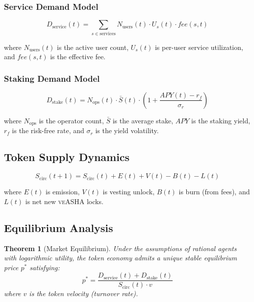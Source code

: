 \documentclass[11pt,a4paper]{article}
\newcommand{\veasha}{\textsc{veASHA}\xspace}
\newtheorem{theorem}{Theorem}
\begin{document}
\subsubsection{Service Demand Model}

\begin{equation}
    D_{\text{service}}(t) = \sum_{s \in \text{services}} N_{\text{users}}(t) \cdot U_s(t) \cdot \mathit{fee}(s, t)
\end{equation}

where $N_{\text{users}}(t)$ is the active user count, $U_s(t)$ is per-user service utilization, and $\mathit{fee}(s, t)$ is the effective fee.

\subsubsection{Staking Demand Model}

\begin{equation}
    D_{\text{stake}}(t) = N_{\text{ops}}(t) \cdot \bar{S}(t) \cdot \left(1 + \frac{\mathit{APY}(t) - r_f}{\sigma_r}\right)
\end{equation}

where $N_{\text{ops}}$ is the operator count, $\bar{S}$ is the average stake, $\mathit{APY}$ is the staking yield, $r_f$ is the risk-free rate, and $\sigma_r$ is the yield volatility.

\subsection{Token Supply Dynamics}

\begin{equation}
    S_{\text{circ}}(t+1) = S_{\text{circ}}(t) + E(t) + V(t) - B(t) - L(t)
\end{equation}

where $E(t)$ is emission, $V(t)$ is vesting unlock, $B(t)$ is burn (from fees), and $L(t)$ is net new \veasha locks.

\subsection{Equilibrium Analysis}

\begin{theorem}[Market Equilibrium]
Under the assumptions of rational agents with logarithmic utility, the token economy admits a unique stable equilibrium price $p^*$ satisfying:
\begin{equation}
    p^* = \frac{D_{\text{service}}(t) + D_{\text{stake}}(t)}{S_{\text{circ}}(t) \cdot v}
\end{equation}
where $v$ is the token velocity (turnover rate).
\end{theorem}
\end{document}
